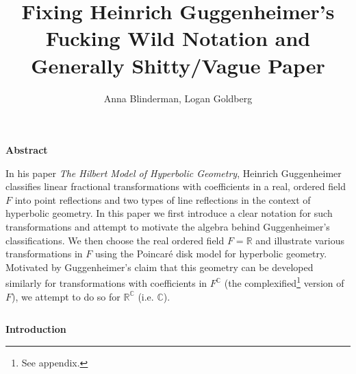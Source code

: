\documentclass[12pt]{article}
\title{Fixing Heinrich Guggenheimer's Fucking Wild Notation and Generally Shitty/Vague Paper}
\author{Anna Blinderman, Logan Goldberg}
\date{}
\newcommand{\R}{\mathbb{R}}
\newcommand{\C}{\mathbb{C}}
\newcommand{\fc}{F^{\C}}
\newcommand{\poincare}{Poincar\'{e} }
\theoremstyle{plain}
\theoremstyle{definition}
\begin{document}
\maketitle

\newcommand{\wtftitle}[1]{\noindent\begin{Large}\textbf{{#1}}\end{Large}\vspace{3mm}}
\newcommand{\wtftheorem}[1]{\noindent\textbf{{#1}}. \hspace{1mm}}
\newcommand{\wtfqed}{\begin{flushright} \qedsymbol \end{flushright}}








\wtftitle{Abstract}

In his paper \textit{The Hilbert Model of Hyperbolic Geometry}, Heinrich Guggenheimer classifies linear fractional transformations with coefficients in a real, ordered field $F$ into point reflections and two types of line reflections in the context of hyperbolic geometry. In this paper we first introduce a clear notation for such transformations and attempt to motivate the algebra behind Guggenheimer's classifications. We then choose the real ordered field $F = \R$ and illustrate various transformations in $F$ using the \poincare disk model for hyperbolic geometry. Motivated by Guggenheimer's claim that this geometry can be developed similarly for transformations with coefficients in $\fc$ (the complexified\footnote{See appendix.} version of $F$), we attempt to do so for $\R^{\C}$ (i.e. $\C$). 








\[\]\wtftitle{Introduction}
\end{document}
